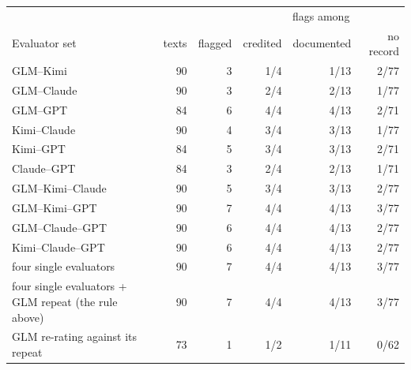\setlength{\tabcolsep}{4pt}\begin{tabular}{@{}lrrrrr@{}}
  \toprule
  & & & \multicolumn{3}{c}{flags among} \\
  \cmidrule(lr){4-6}
  Evaluator set & texts & flagged & credited & documented & no record \\
  \midrule
  GLM--Kimi & 90 & 3 & 1/4 & 1/13 & 2/77 \\
  GLM--Claude & 90 & 3 & 2/4 & 2/13 & 1/77 \\
  GLM--GPT & 84 & 6 & 4/4 & 4/13 & 2/71 \\
  Kimi--Claude & 90 & 4 & 3/4 & 3/13 & 1/77 \\
  Kimi--GPT & 84 & 5 & 3/4 & 3/13 & 2/71 \\
  Claude--GPT & 84 & 3 & 2/4 & 2/13 & 1/71 \\
  \midrule
  GLM--Kimi--Claude & 90 & 5 & 3/4 & 3/13 & 2/77 \\
  GLM--Kimi--GPT & 90 & 7 & 4/4 & 4/13 & 3/77 \\
  GLM--Claude--GPT & 90 & 6 & 4/4 & 4/13 & 2/77 \\
  Kimi--Claude--GPT & 90 & 6 & 4/4 & 4/13 & 2/77 \\
  \midrule
  four single evaluators & 90 & 7 & 4/4 & 4/13 & 3/77 \\
  four single evaluators + GLM repeat (the rule above) & 90 & 7 & 4/4 & 4/13 & 3/77 \\
  GLM re-rating against its repeat & 73 & 1 & 1/2 & 1/11 & 0/62 \\
  \bottomrule
\end{tabular}
\par\vspace{1pt}{\raggedright\scriptsize A text counts for a set when at least two of its evaluators rated it (GPT-5.6-Sol rated the 84 P3/P6 texts, the GLM-5.3 repeat 73 texts, the others all 90), so a set containing GPT reduces to its other members on P2. Credited = flagged credited-defective texts / credited-defective texts the set rated; documented and no record likewise. Counts, not rates: with 4 credited-defective texts the differences between sets are a handful of texts.\par}
